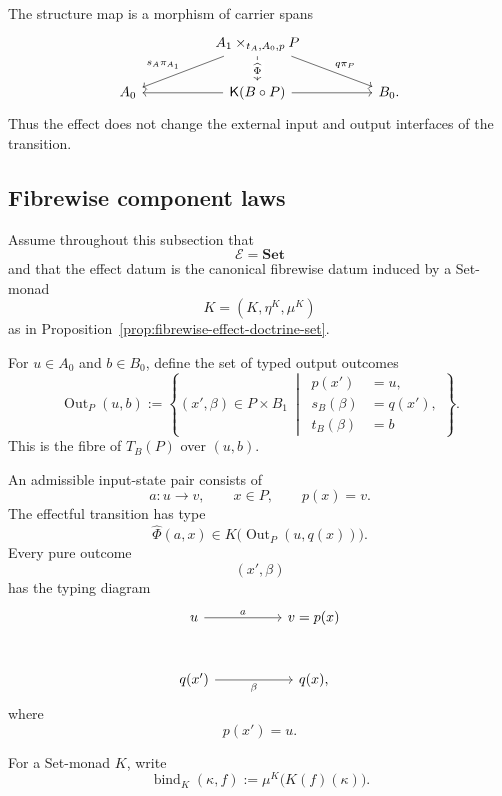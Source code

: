 The structure map is a morphism of carrier spans
\[
    \begin{tikzcd}[column sep=huge]
        &
            A_1\times_{t_A,A_0,p}P
                \arrow[d, "\widehat\Phi" description]
                \arrow[dl, "s_A\pi_{A_1}"']
                \arrow[dr, "q\pi_P"]
        &
        \\
            A_0
        &
            \mathsf K(B\circ P)
                \arrow[l]
                \arrow[r]
        &
            B_0.
    \end{tikzcd}
\]
Thus the effect does not change the external input and output interfaces of the
transition.

\subsection{Fibrewise component laws}
\label{subsec:fibrewise-effectful-mealy-laws}

Assume throughout this subsection that
\[
    \mathcal E=\mathbf{Set}
\]
and that the effect datum is the canonical fibrewise datum induced by a
Set-monad
\[
    K=(K,\eta^K,\mu^K)
\]
as in Proposition~\ref{prop:fibrewise-effect-doctrine-set}.

For \(u\in A_0\) and \(b\in B_0\), define the set of typed output outcomes
\[
    \operatorname{Out}_P(u,b)
    :=
    \left\{
        (x',\beta)\in P\times B_1
        \ \middle|\
        \begin{aligned}
            p(x')&=u,\\
            s_B(\beta)&=q(x'),\\
            t_B(\beta)&=b
        \end{aligned}
    \right\}.
\]
This is the fibre of \(T_B(P)\) over \((u,b)\).

An admissible input-state pair consists of
\[
    a:u\to v,
    \qquad
    x\in P,
    \qquad
    p(x)=v.
\]
The effectful transition has type
\[
    \widehat\Phi(a,x)
    \in
    K\bigl(
        \operatorname{Out}_P(u,q(x))
    \bigr).
\]
Every pure outcome
\[
    (x',\beta)
\]
has the typing diagram
\[
    \begin{tikzcd}[column sep=huge, row sep=large]
            u
                \arrow[r, "a"]
        &
            v=p(x)
        \\
            q(x')
                \arrow[r, "\beta"']
        &
            q(x),
    \end{tikzcd}
\]
where
\[
    p(x')=u.
\]

For a Set-monad \(K\), write
\[
    \operatorname{bind}_{K}(\kappa,f)
    :=
    \mu^K\bigl(K(f)(\kappa)\bigr).
\]

